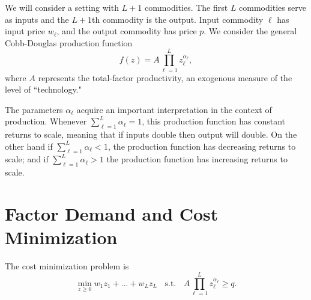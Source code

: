 \documentclass[12pt]{article}
\theoremstyle{definition}
\begin{document}
\maketitle
\singlespace
We will consider a setting with $L+1$ commodities. The first $L$ commodities serve as inputs and the $L+1$th commodity is the output. Input commodity $\ell$ has input price $w_{\ell}$, and the output commodity has price $p$. We consider the general Cobb-Douglas production function
	\[	f(z)=A \prod_{{\ell}=1}^L z_{\ell}^{\alpha_{\ell}},\]
where $A$ represents the total-factor productivity, an exogenous measure of the level of ``technology."

The parameters $\alpha_{\ell}$ acquire an important interpretation in the context of production. Whenever $\sum_{\ell = 1}^L \alpha_{\ell} = 1$, this production function has constant returns to scale, meaning that if inputs double then output will double. On the other hand if $\sum_{\ell = 1}^L \alpha_{\ell} < 1$, the production function has decreasing returns to scale; and if $\sum_{\ell = 1}^L \alpha_{\ell} > 1$ the production function has increasing returns to scale.


\section{Factor Demand and Cost Minimization}
The cost minimization problem is
	\[	\min_{z \geq 0} w_1z_1 + ... + w_{L}z_{L}  \;\; \text{ s.t. } \;\; A \prod_{\ell = 1}^{L} z_{\ell}^{\alpha_{\ell}} \geq q. \]		
    
    
\end{document}
